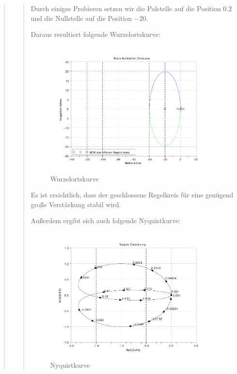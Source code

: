 \begin{quote}
\begin{quote}
        Durch einiges Probieren setzen wir die Polstelle auf die Position $0.2$ und die Nullstelle auf die Position
        $-20$.
        
        Daraus resultiert folgende Wurzelortskurve:
        
        \begin{figure}[H]
        \centering
            \includegraphics[scale=0.7, trim = 0cm 0cm 0cm 0cm, clip]{./Bilder/WOK}
                \caption{Wurzelortskurve}
        \end{figure}
        
        Es ist ersichtlich, dass der geschlossene Regelkreis für eine genügend große Verstärkung stabil
        wird.\vspace{1em}
        
        Außerdem ergibt sich auch folgende Nyquistkurve:
        
        \begin{figure}[H]
        \centering
            \includegraphics[scale=0.7, trim = 0cm 0cm 0cm 0cm, clip]{./Bilder/Nyquistkurve}
                \caption{Nyquistkurve}
        \end{figure}
        

\end{quote}
\end{quote}
